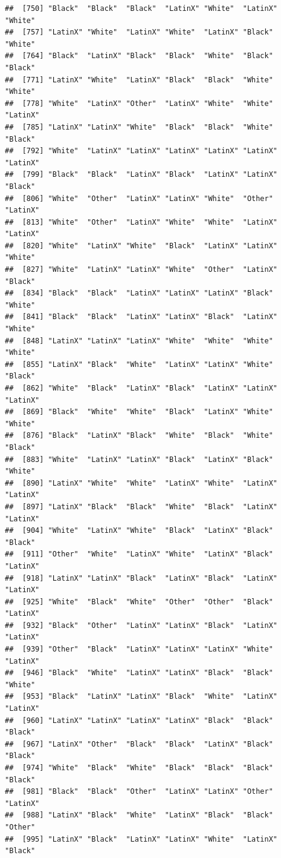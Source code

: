 \documentclass[]{book}
\begin{document}
\begin{verbatim}
##  [750] "Black"  "Black"  "Black"  "LatinX" "White"  "LatinX" "White" 
##  [757] "LatinX" "White"  "LatinX" "White"  "LatinX" "Black"  "White" 
##  [764] "Black"  "LatinX" "Black"  "Black"  "White"  "Black"  "Black" 
##  [771] "LatinX" "White"  "LatinX" "Black"  "Black"  "White"  "White" 
##  [778] "White"  "LatinX" "Other"  "LatinX" "White"  "White"  "LatinX"
##  [785] "LatinX" "LatinX" "White"  "Black"  "Black"  "White"  "Black" 
##  [792] "White"  "LatinX" "LatinX" "LatinX" "LatinX" "LatinX" "LatinX"
##  [799] "Black"  "Black"  "LatinX" "Black"  "LatinX" "LatinX" "Black" 
##  [806] "White"  "Other"  "LatinX" "LatinX" "White"  "Other"  "LatinX"
##  [813] "White"  "Other"  "LatinX" "White"  "White"  "LatinX" "LatinX"
##  [820] "White"  "LatinX" "White"  "Black"  "LatinX" "LatinX" "White" 
##  [827] "White"  "LatinX" "LatinX" "White"  "Other"  "LatinX" "Black" 
##  [834] "Black"  "Black"  "LatinX" "LatinX" "LatinX" "Black"  "White" 
##  [841] "Black"  "Black"  "LatinX" "LatinX" "Black"  "LatinX" "White" 
##  [848] "LatinX" "LatinX" "LatinX" "White"  "White"  "White"  "White" 
##  [855] "LatinX" "Black"  "White"  "LatinX" "LatinX" "White"  "Black" 
##  [862] "White"  "Black"  "LatinX" "Black"  "LatinX" "LatinX" "LatinX"
##  [869] "Black"  "White"  "White"  "Black"  "LatinX" "White"  "White" 
##  [876] "Black"  "LatinX" "Black"  "White"  "Black"  "White"  "Black" 
##  [883] "White"  "LatinX" "LatinX" "Black"  "LatinX" "Black"  "White" 
##  [890] "LatinX" "White"  "White"  "LatinX" "White"  "LatinX" "LatinX"
##  [897] "LatinX" "Black"  "Black"  "White"  "Black"  "LatinX" "LatinX"
##  [904] "White"  "LatinX" "White"  "Black"  "LatinX" "Black"  "Black" 
##  [911] "Other"  "White"  "LatinX" "White"  "LatinX" "Black"  "LatinX"
##  [918] "LatinX" "LatinX" "Black"  "LatinX" "Black"  "LatinX" "LatinX"
##  [925] "White"  "Black"  "White"  "Other"  "Other"  "Black"  "LatinX"
##  [932] "Black"  "Other"  "LatinX" "LatinX" "Black"  "LatinX" "LatinX"
##  [939] "Other"  "Black"  "LatinX" "LatinX" "LatinX" "White"  "LatinX"
##  [946] "Black"  "White"  "LatinX" "LatinX" "Black"  "Black"  "White" 
##  [953] "Black"  "LatinX" "LatinX" "Black"  "White"  "LatinX" "LatinX"
##  [960] "LatinX" "LatinX" "LatinX" "LatinX" "Black"  "Black"  "Black" 
##  [967] "LatinX" "Other"  "Black"  "Black"  "LatinX" "Black"  "Black" 
##  [974] "White"  "Black"  "White"  "Black"  "Black"  "Black"  "Black" 
##  [981] "Black"  "Black"  "Other"  "LatinX" "LatinX" "Other"  "LatinX"
##  [988] "LatinX" "Black"  "White"  "LatinX" "Black"  "Black"  "Other" 
##  [995] "LatinX" "Black"  "LatinX" "LatinX" "White"  "LatinX" "Black" 

\end{verbatim}
\end{document}
